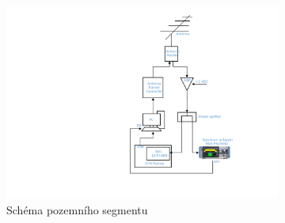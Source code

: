 \documentclass[twoside]{ctuthesis}
\theoremstyle{plain}
\theoremstyle{definition}
\theoremstyle{note}
\begin{document}
	\begin{figure}[hbtp]
		\centering
		\begin{subfigure}{.49\textwidth}
			\centering
			\includegraphics[height=1.2\textwidth]{Figures/ground_segment.pdf}
			\caption{Schéma pozemního segmentu}
			\label{fig:ground:segment:sch}
		\end{subfigure}
		\begin{subfigure}{.49\textwidth}
			\centering

\end{subfigure}
\end{figure}
\end{document}
